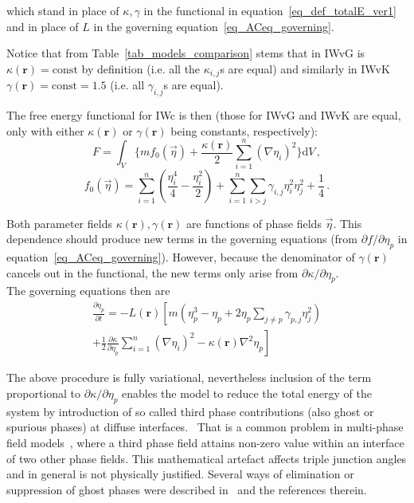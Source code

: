 which stand in place of $\kappa,\gamma$ in the functional in equation~\eqref{eq_def_totalE_ver1} and in place of $L$ in the governing equation~\eqref{eq_ACeq_governing}.

Notice that from Table~\ref{tab_models_comparison} stems  that in IWvG is $\kappa(\bm{r})=\mathrm{const}$ by definition (i.e. all the $\kappa_{i,j}$s are equal) and similarly in IWvK $\gamma(\bm{r})=\mathrm{const}=1.5$ (i.e. all $\gamma_{i,j}$s are equal). 

The free energy functional for IWc is then (those for IWvG and IWvK are equal, only with either $\kappa(\bm{r})$ or $\gamma(\bm{r})$ being constants, respectively):
\begin{equation} \label{eq_def_totalE_ver2}
	F = \int_V \Bigg\{ m f_0(\vec{\eta}) + \frac{\kappa(\bm{r})}{2}\sum_{i=1}^n(\nabla \eta_i)^2 \Bigg\} \mathrm{d}V \,,
\end{equation}
\begin{equation}
	f_0(\vec{\eta}) = \sum_{i=1}^n\left(\frac{\eta_i^4}{4} - \frac{\eta_i^2}{2} \right) +\sum_{i=1}^n\sum_{i>j}\gamma_{i,j}\eta_i^2\eta_j^2 + \frac{1}{4} \,.
\end{equation}

Both parameter fields $\kappa(\bm{r}),\gamma(\bm{r})$ are functions of phase fields $\vec{\eta}$. This dependence should produce new terms in the governing equations (from $\partial f/\partial \eta_p$ in equation~\eqref{eq_ACeq_governing}). However, because the denominator of $\gamma(\bm{r})$ cancels out in the functional, the new terms only arise from $\partial \kappa/\partial \eta_p$.\\
The governing equations then are 
\begin{equation}
	\begin{split}
		\frac{\partial \eta_p}{\partial t} = -L(\bm{r})\left[ m\left( \eta_p^3-\eta_p +  2\eta_p\sum_{j\neq p}\gamma_{p,j}\eta_j^2 \right) \right. \\ \left. +\frac{1}{2}\frac{\partial \kappa}{\partial\eta_p}\sum_{i=1}^n(\nabla\eta_i)^2 - \kappa(\bm{r})\nabla^2\eta_p \right] 
	\end{split}
\end{equation}

The above procedure is fully variational, nevertheless inclusion of the term proportional to $\partial \kappa/\partial \eta_p$ enables the model to reduce the total energy of the system by introduction of so called third phase contributions (also ghost or spurious phases) at diffuse interfaces.~\cite{Moelans2008} That is a common problem in multi-phase field models~\cite{Toth2015}, where a third phase field attains non-zero value within an interface of two other phase fields. This mathematical artefact affects triple junction angles and in general is not physically justified. Several ways of elimination or suppression of ghost phases were described in~\cite{Toth2015} and the references therein.

